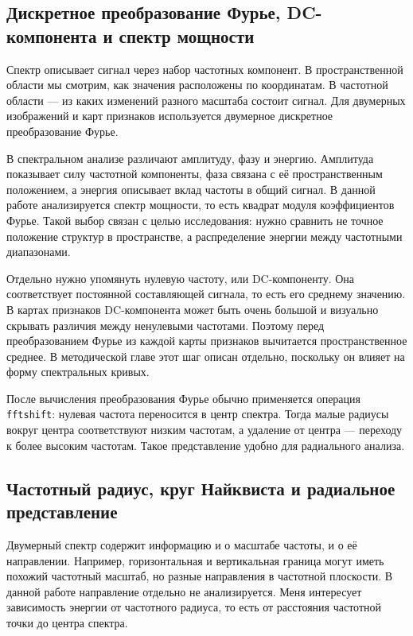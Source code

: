 \subsection{Дискретное преобразование Фурье, DC-компонента и спектр мощности}

Спектр описывает сигнал через набор частотных компонент. В пространственной области мы смотрим, как значения расположены по координатам. В частотной области — из каких изменений разного масштаба состоит сигнал. Для двумерных изображений и карт признаков используется двумерное дискретное преобразование Фурье.

В спектральном анализе различают амплитуду, фазу и энергию. Амплитуда показывает силу частотной компоненты, фаза связана с её пространственным положением, а энергия описывает вклад частоты в общий сигнал. В данной работе анализируется спектр мощности, то есть квадрат модуля коэффициентов Фурье. Такой выбор связан с целью исследования: нужно сравнить не точное положение структур в пространстве, а распределение энергии между частотными диапазонами.

Отдельно нужно упомянуть нулевую частоту, или DC-компоненту. Она соответствует постоянной составляющей сигнала, то есть его среднему значению. В картах признаков DC-компонента может быть очень большой и визуально скрывать различия между ненулевыми частотами. Поэтому перед преобразованием Фурье из каждой карты признаков вычитается пространственное среднее. В методической главе этот шаг описан отдельно, поскольку он влияет на форму спектральных кривых.

После вычисления преобразования Фурье обычно применяется операция \texttt{fftshift}: нулевая частота переносится в центр спектра. Тогда малые радиусы вокруг центра соответствуют низким частотам, а удаление от центра — переходу к более высоким частотам. Такое представление удобно для радиального анализа.

\subsection{Частотный радиус, круг Найквиста и радиальное представление}

Двумерный спектр содержит информацию и о масштабе частоты, и о её направлении. Например, горизонтальная и вертикальная граница могут иметь похожий частотный масштаб, но разные направления в частотной плоскости. В данной работе направление отдельно не анализируется. Меня интересует зависимость энергии от частотного радиуса, то есть от расстояния частотной точки до центра спектра.

